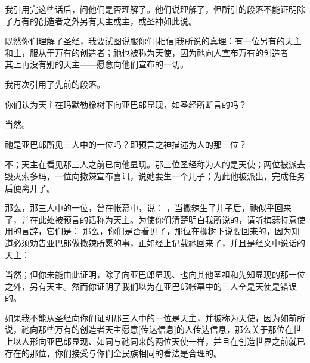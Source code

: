 我引用完这些话后，问他们是否理解了。他们说理解了，但所引的段落不能证明除了万有的创造者之外另有天主或主，或圣神如此说。\par

 既然你们理解了圣经，我要试图说服你们[相信]我所说的真理：有一位另有的天主和主，服从于万有的创造者；祂也被称为天使，因为祂向人宣布万有的创造者——其上再没有别的天主——愿意向他们宣布的一切。\par

我再次引用了先前的段落。\par

 你们认为天主在玛默勒橡树下向亚巴郎显现，如圣经所断言的吗？\par

 当然。\par

 祂是亚巴郎所见三人中的一位吗？即预言之神描述为人的那三位？\par

 不；天主在看见那三人之前已向他显现。那三位圣经称为人的是天使；两位被派去毁灭索多玛，一位向撒辣宣布喜讯，说她要生一个儿子；为此他被派出，完成任务后便离开了。\par

 那么，那三人中的一位，曾在帐幕中，说： ，当撒辣生了儿子后，祂似乎回来了，并在此处被预言的话称为天主。为使你们清楚明白我所说的，请听梅瑟特意使用的言辞，它们是：  那么，你们是否看见了，那位在橡树下说要回来的，因为知道必须劝告亚巴郎做撒辣所愿的事，正如经上记载祂回来了，并且是经文中说话的天主：\par

 当然；但你未能由此证明，除了向亚巴郎显现、也向其他圣祖和先知显现的那一位之外，另有天主。然而你证明了我们以为在亚巴郎帐幕中的三人全是天使是错误的。\par

 如果我不能从圣经向你们证明那三人中的一位是天主，并被称为天使，因为如前所说，祂向那些万有的创造者天主愿意[传达信息]的人传达信息，那么关于那位在世上以人形向亚巴郎显现、如同与祂同来的两位天使一样，并且在创造世界之前就已存在的那位，你们接受与你们全民族相同的看法是合理的。\par

